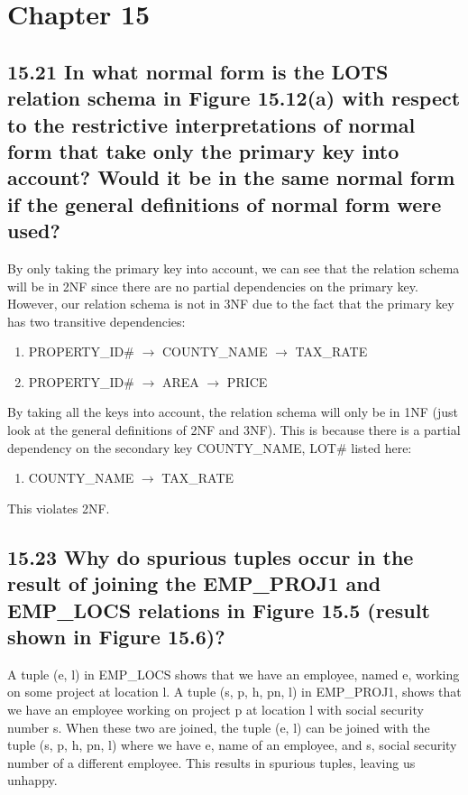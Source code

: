 \section*{Chapter 15}

\subsection*{15.21 In what normal form is the LOTS relation schema in Figure 15.12(a) with respect to the restrictive interpretations of normal form that take only the primary key into account? Would it be in the same normal form if the general definitions of normal form were used?}

By only taking the primary key into account, we can see that the relation schema will be in 2NF since there are no partial dependencies on the primary key. However, our relation schema is not in 3NF due to the fact that the primary key has two transitive dependencies:
\begin{enumerate}
\item[] PROPERTY\_ID$\#$ $\rightarrow$ COUNTY\_NAME $\rightarrow$ TAX\_RATE
\item[] PROPERTY\_ID$\#$ $\rightarrow$ AREA $\rightarrow$ PRICE
\end{enumerate}
By taking all the keys into account, the relation schema will only be in 1NF (just look at the general definitions of 2NF and 3NF). This is because there is a partial dependency on the secondary key {COUNTY\_NAME, LOT\#} listed here:
\begin{enumerate}
\item[]COUNTY\_NAME $\rightarrow$ TAX\_RATE
\end{enumerate}
This violates 2NF.

\subsection*{15.23 Why do spurious tuples occur in the result of joining the EMP\_PROJ1 and EMP\_LOCS relations in Figure 15.5 (result shown in Figure 15.6)?}

A tuple (e, l) in EMP\_LOCS shows that we have an employee, named e, working on some project at location l. A tuple (s, p, h, pn, l) in EMP\_PROJ1, shows that we have an employee working on project p at location l with social security number s. When these two are joined, the tuple (e, l) can be joined with the tuple (s, p, h, pn, l) where we have e, name of an employee, and s, social security number of a different employee. This results in spurious tuples, leaving us unhappy.

